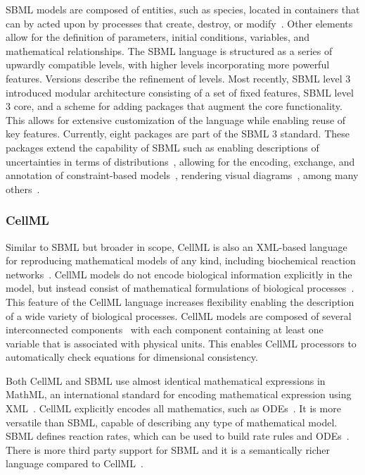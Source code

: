 \documentclass[12pt]{report}
\begin{document}
SBML models are composed of entities, such as species, located in containers that can by acted upon by processes that create, destroy, or modify~\cite{Keating2020}. Other elements allow for the definition of parameters, initial conditions, variables, and mathematical relationships. The SBML language is structured as a series of upwardly compatible levels, with higher levels incorporating more powerful features. Versions describe the refinement of levels. Most recently, SBML level 3 introduced modular architecture consisting of a set of fixed features, SBML level 3 core, and a scheme for adding packages that augment the core functionality. This allows for extensive customization of the language while enabling reuse of key features. Currently, eight packages are part of the SBML 3 standard. These packages extend the capability of SBML such as enabling descriptions of uncertainties in terms of distributions~\cite{Smith2020}, allowing for the encoding, exchange, and annotation of constraint-based models~\cite{Olivier2018},  rendering visual diagrams~\cite{Gauges2015}, among many others~\cite{Keating2020}. 


\subsubsection{CellML}
Similar to SBML but broader in scope, CellML is also an XML-based language for reproducing mathematical models of any kind, including biochemical reaction networks~\cite{Beard2009}. CellML models do not encode biological information explicitly in the model, but instead consist of mathematical formulations of biological processes~\cite{Wimalaratne2009}. This feature of the CellML language increases flexibility enabling the description of a wide variety of biological processes. CellML models are composed of several interconnected components~\cite{Mesiti} with each component containing at least one variable that is associated with physical units.  This enables CellML processors to automatically check equations for dimensional consistency. 


Both CellML and SBML use almost identical mathematical expressions in MathML, an international standard for encoding mathematical expression using XML~\cite{Caprotti1999}. CellML explicitly encodes all mathematics, such as ODEs~\cite{Smith2013}. It is more versatile than SBML, capable of describing any type of mathematical model. SBML defines reaction rates, which can be used to build rate rules and ODEs~\cite{Hucka2015}. There is more third party support for SBML and it is a semantically richer language compared to CellML~\cite{machado_modeling_2011, Smith2013}.
\end{document}
